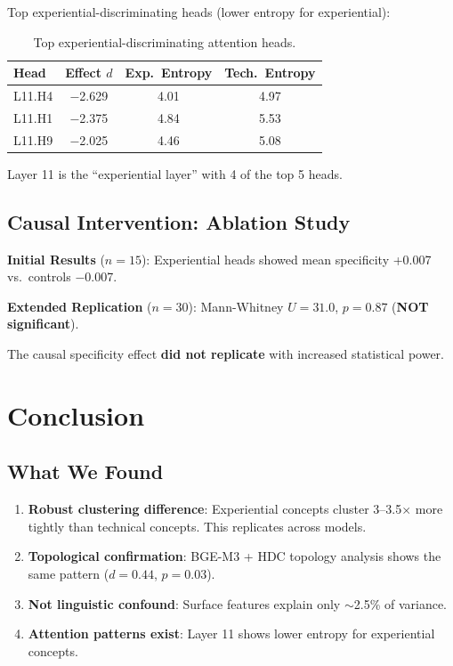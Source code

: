 \documentclass[11pt,a4paper]{article}
\newcommand{\pval}{\textit{p}}
\newcommand{\dval}{\textit{d}}
\begin{document}
Top experiential-discriminating heads (lower entropy for experiential):

\begin{table}[H]
\centering
\begin{tabular}{lccc}
\toprule
\textbf{Head} & \textbf{Effect $\dval$} & \textbf{Exp.\ Entropy} & \textbf{Tech.\ Entropy} \\
\midrule
L11.H4 & $-$2.629 & 4.01 & 4.97 \\
L11.H1 & $-$2.375 & 4.84 & 5.53 \\
L11.H9 & $-$2.025 & 4.46 & 5.08 \\
\bottomrule
\end{tabular}
\caption{Top experiential-discriminating attention heads.}
\label{tab:attention}
\end{table}

Layer 11 is the ``experiential layer'' with 4 of the top 5 heads.

\subsection{Causal Intervention: Ablation Study}

\textbf{Initial Results} ($n=15$): Experiential heads showed mean specificity +0.007 vs.\ controls $-$0.007.

\textbf{Extended Replication} ($n=30$): Mann-Whitney $U = 31.0$, $\pval = 0.87$ (\textbf{NOT significant}).

The causal specificity effect \textbf{did not replicate} with increased statistical power.

\section{Conclusion}

\subsection{What We Found}

\begin{enumerate}
    \item \textbf{Robust clustering difference}: Experiential concepts cluster 3--3.5$\times$ more tightly than technical concepts. This replicates across models.
    \item \textbf{Topological confirmation}: BGE-M3 + HDC topology analysis shows the same pattern ($\dval=0.44$, $\pval=0.03$).
    \item \textbf{Not linguistic confound}: Surface features explain only $\sim$2.5\% of variance.
    \item \textbf{Attention patterns exist}: Layer 11 shows lower entropy for experiential concepts.
\end{enumerate}
\end{document}
